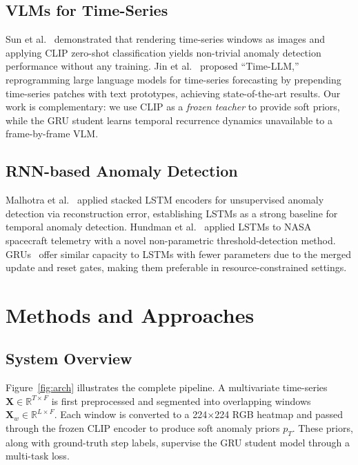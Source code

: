 \documentclass[10pt,twocolumn]{article}
\begin{document}
\subsection{VLMs for Time-Series}
Sun et al.~\cite{sun2024timeseriesclipanom} demonstrated that rendering time-series windows as images and applying CLIP zero-shot classification yields non-trivial anomaly detection performance without any training. Jin et al.~\cite{jin2024timellm} proposed ``Time-LLM,'' reprogramming large language models for time-series forecasting by prepending time-series patches with text prototypes, achieving state-of-the-art results. Our work is complementary: we use CLIP as a \emph{frozen teacher} to provide soft priors, while the GRU student learns temporal recurrence dynamics unavailable to a frame-by-frame VLM.

\subsection{RNN-based Anomaly Detection}
Malhotra et al.~\cite{malhotra2015lstm} applied stacked LSTM encoders for unsupervised anomaly detection via reconstruction error, establishing LSTMs as a strong baseline for temporal anomaly detection. Hundman et al.~\cite{hundman2018detecting} applied LSTMs to NASA spacecraft telemetry with a novel non-parametric threshold-detection method. GRUs~\cite{gru2014} offer similar capacity to LSTMs with fewer parameters due to the merged update and reset gates, making them preferable in resource-constrained settings.

\section{Methods and Approaches}
\label{sec:methods}

\subsection{System Overview}

Figure~\ref{fig:arch} illustrates the complete pipeline. A multivariate time-series $\mathbf{X} \in \mathbb{R}^{T \times F}$ is first preprocessed and segmented into overlapping windows $\mathbf{X}_w \in \mathbb{R}^{L \times F}$. Each window is converted to a 224$\times$224 RGB heatmap and passed through the frozen CLIP encoder to produce soft anomaly priors $p_T$. These priors, along with ground-truth step labels, supervise the GRU student model through a multi-task loss.
\end{document}
